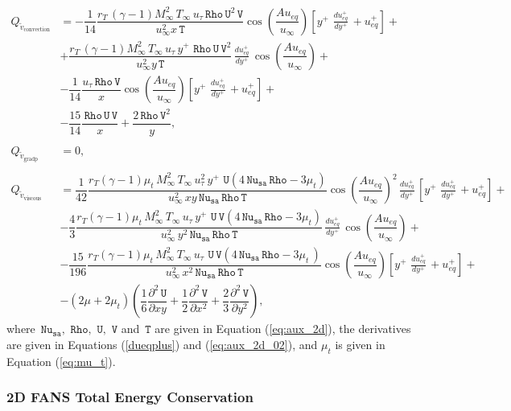 \documentclass[10pt]{article}
\newcommand{\diff}[2] {\dfrac{\partial #1}{\partial #2}}
\newcommand{\Rho}{\,\mathtt{Rho}}
\newcommand{\U}{\,\mathtt{U}}
\newcommand{\V}{\,\mathtt{V}}
\newcommand{\Nu}{\,\mathtt{Nu_{sa}}}
\newcommand{\T}{\,\mathtt{T}}
\newcommand{\Dueqplusyplus}{\, \frac{du_{eq}^+}{dy^+}\,}
\newcommand{\tv}{\tilde{v}}
\begin{document}
\begin{equation}
 \begin{split}
Q_{\tv_\text{convection}} &= -\dfrac{1}{14} \dfrac{r_T \, (\gamma-1) M_{\infty}^2 \, T_{\infty} \,  u_{\tau} \Rho \U^2 \V}{u_{\infty}^2 x \T}  \cos\left(\dfrac{A u_{eq}}{u_{\infty}}\right)\left[y^{+} \, \Dueqplusyplus+u_{eq}^{+} \right]+\\
  &+ \dfrac{r_T \, (\gamma-1) M_{\infty}^2 \, T_{\infty} \,   u_{\tau} \, y^{+} \, \Rho \U \V^2 }{u_{\infty}^2 y \T}\Dueqplusyplus \cos\left(\dfrac{A u_{eq}}{u_{\infty}}\right)+\\
  &-\dfrac{1}{14} \dfrac{ u_{\tau} \Rho \V}{x}  \cos\left(\dfrac{A u_{eq}}{u_{\infty}}\right)\left[y^{+} \, \Dueqplusyplus+u_{eq}^{+} \right]+\\
  &-\dfrac{15}{14} \dfrac{\Rho \U \V}{x}+ \dfrac{2 \Rho \V^2}{y} ,\\
%
&\\
% 
 Q_{\tv_\text{gradp}} &= 0,\\
%
&\\
%
Q_{\tv_\text{viscous}} &= \dfrac{1}{42}  \dfrac{ r_T  (\gamma-1)\mu_t \, M_{\infty}^2 \, T_{\infty} \, u_{\tau}^2 \, y^{+} \, \U (4 \Nu \Rho-3 \mu_t )}{u_{\infty}^2 \, x y \Nu \Rho  \T} \cos\left(\dfrac{A u_{eq}}{u_{\infty}}\right)^2 \Dueqplusyplus\left[y^{+} \, \Dueqplusyplus+u_{eq}^{+}\right]+\\
 &-\dfrac{4}{3}  \dfrac{r_T (\gamma-1)\mu_t \, M_{\infty}^2 \, T_{\infty} \, u_{\tau} \, y^{+} \, \U \V (4 \Nu \Rho-3 \mu_t ) }{u_{\infty}^2 \, y^2 \Nu \Rho  \T} \Dueqplusyplus\cos\left(\dfrac{A u_{eq}}{u_{\infty}}\right) +\\
 &-\dfrac{15}{196}  \dfrac{ r_T (\gamma-1)\mu_t \, M_{\infty}^2 \, T_{\infty} \, u_{\tau} \, \U \V (4 \Nu \Rho-3 \mu_t \, )}{u_{\infty}^2 \, x^2 \Nu \Rho  \T} \cos\left(\dfrac{A u_{eq}}{u_{\infty}}\right)\left[y^{+} \, \Dueqplusyplus+u_{eq}^{+}\right]+\\
 &-(2 \mu + 2 \mu_t) \left(\dfrac{1}{6} \diff{^2 \U}{xy}+\dfrac{1}{2}  \diff{^2 \V}{x^2}+\dfrac{2}{3} \diff{^2 \V}{y^2}\right) ,
 \end{split}	
\end{equation}
%
where $\Nu,\, \Rho,\,\U,\,\V$ and $\T$ are given in Equation (\ref{eq:aux_2d}), the derivatives are given in Equations (\ref{dueqplus}) and (\ref{eq:aux_2d_02}), and $\mu_t$ is given in Equation (\ref{eq:mu_t}).



\subsubsection{2D FANS Total Energy Conservation}
\end{document}
